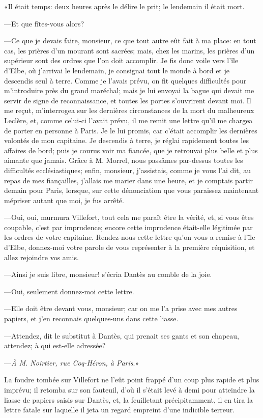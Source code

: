 «Il était temps: deux heures après le délire le prit; le lendemain il était mort.

—Et que fîtes-vous alors?

—Ce que je devais faire, monsieur, ce que tout autre eût fait à ma place: en tout cas, les prières d'un mourant sont sacrées; mais, chez les marins, les prières d'un supérieur sont des ordres que l'on doit accomplir. Je fis donc voile vers l'île d'Elbe, où j'arrivai le lendemain, je consignai tout le monde à bord et je descendis seul à terre. Comme je l'avais prévu, on fit quelques difficultés pour m'introduire près du grand maréchal; mais je lui envoyai la bague qui devait me servir de signe de reconnaissance, et toutes les portes s'ouvrirent devant moi. Il me reçut, m'interrogea sur les dernières circonstances de la mort du malheureux Leclère, et, comme celui-ci l'avait prévu, il me remit une lettre qu'il me chargea de porter en personne à Paris. Je le lui promis, car c'était accomplir les dernières volontés de mon capitaine. Je descendis à terre, je réglai rapidement toutes les affaires de bord; puis je courus voir ma fiancée, que je retrouvai plus belle et plus aimante que jamais. Grâce à M. Morrel, nous passâmes par-dessus toutes les difficultés ecclésiastiques; enfin, monsieur, j'assistais, comme je vous l'ai dit, au repas de mes fiançailles, j'allais me marier dans une heure, et je comptais partir demain pour Paris, lorsque, sur cette dénonciation que vous paraissez maintenant mépriser autant que moi, je fus arrêté.

—Oui, oui, murmura Villefort, tout cela me paraît être la vérité, et, si vous êtes coupable, c'est par imprudence; encore cette imprudence était-elle légitimée par les ordres de votre capitaine. Rendez-nous cette lettre qu'on vous a remise à l'île d'Elbe, donnez-moi votre parole de vous représenter à la première réquisition, et allez rejoindre vos amis.

—Ainsi je suis libre, monsieur! s'écria Dantès au comble de la joie.

—Oui, seulement donnez-moi cette lettre.

—Elle doit être devant vous, monsieur; car on me l'a prise avec mes autres papiers, et j'en reconnais quelques-uns dans cette liasse.

—Attendez, dit le substitut à Dantès, qui prenait ses gants et son chapeau, attendez; à qui est-elle adressée?

—\textit{À M. Noirtier, rue Coq-Héron, à Paris}.»

La foudre tombée sur Villefort ne l'eût point frappé d'un coup plus rapide et plus imprévu; il retomba sur son fauteuil, d'où il s'était levé à demi pour atteindre la liasse de papiers saisis sur Dantès, et, la feuilletant précipitamment, il en tira la lettre fatale sur laquelle il jeta un regard empreint d'une indicible terreur.

